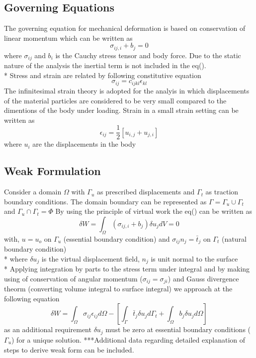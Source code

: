 \documentclass[11pt]{article}
\begin{document}
\subsection{Governing Equations}
The governing equation for mechanical deformation is based on conservation of
linear momentum which can be written as
\begin{equation}
\sigma_{ij,i} + b_j = 0
\end{equation}
where $ \sigma_{ij} $ and $ b_i $ is the Cauchy stress tensor and body force.
Due to the static nature of the analysis the inertial term is not included in
the eq().\\*
Stress and strain are related by following constitutive equation
\begin{equation}
\sigma_{ij} = c_{ijkl} \epsilon_{kl}
\end{equation}
The infinitesimal strain theory is adopted for the analyis in which
displacements of the material particles are considered to be very small compared
to the dimentions of the body under loading. Strain in a small strain setting
can be written as
\begin{equation}
\epsilon_{ij}=\frac{1}{2}[u_{i,j}+u_{j,i}]
\end{equation}
where $ u_{i} $ are the displacements in the body


\subsection{Weak Formulation}
Consider a domain $\Omega$ with $\Gamma_u$ as prescribed displacements and
$\Gamma_t$ as traction boundary conditions. The domain boundary can be
represented as $\Gamma = \Gamma_u \cup \Gamma_t$ and $\Gamma_u \cap \Gamma_t =
\Phi$
By using the principle of virtual work the eq() can be written as
\begin{equation}
\delta W = \int_\Omega (\sigma_{ij,i} + b_j ) \delta u_j dV = 0
\end{equation} 
with,
$u = u_o$ on $\Gamma_u$ (essential boundary condition) and
$\sigma_{ij}n_j = \bar{t}_j$ on $\Gamma_t$ (natural boundary condition) \\*
where $\delta u_j$ is the virtual displacement field, $n_j$ is unit normal to
the surface \\*
Applying integration by parts to the stress term under integral and by making
using of conservation of angular momentum ($ \sigma_{ij} = \sigma_{ji} $) and
Gauss divergence theorm (converting volume integral to surface integral) we
approach at the following equation
\begin{equation} \label{FinalWeakform}
\delta W = \int_{\Omega} \sigma_{ij} \epsilon_{ij} d\Omega - \left[
\int_{\Gamma} \bar{t}_j \delta u_j d\Gamma_t  + \int_{\Omega} b_j \delta u_j
d\Omega \right]
\end{equation}
as an additional requirement $\delta u_j$ must be zero at essential boundary
conditions ($\Gamma_u$) for a unique solution.
***Additional data regarding detailed explanation of steps to derive weak form
can be included.
\end{document}
